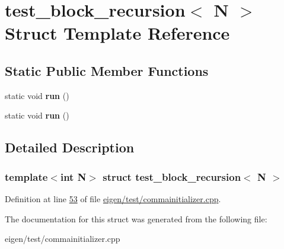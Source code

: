 \hypertarget{structtest__block__recursion}{}\section{test\+\_\+block\+\_\+recursion$<$ N $>$ Struct Template Reference}
\label{structtest__block__recursion}
\subsection*{Static Public Member Functions}
\begin{DoxyCompactItemize}
\item 
\mbox{\label{structtest__block__recursion_a52d065660ea11781e5671ad0e142e0ca}} 
static void {\bfseries run} ()
\item 
\mbox{\label{structtest__block__recursion_a52d065660ea11781e5671ad0e142e0ca}} 
static void {\bfseries run} ()
\end{DoxyCompactItemize}


\subsection{Detailed Description}
\subsubsection*{template$<$int N$>$\newline
struct test\+\_\+block\+\_\+recursion$<$ N $>$}



Definition at line \hyperlink{eigen_2test_2commainitializer_8cpp_source_l00053}{53} of file \hyperlink{eigen_2test_2commainitializer_8cpp_source}{eigen/test/commainitializer.\+cpp}.



The documentation for this struct was generated from the following file\+:\begin{DoxyCompactItemize}
\item 
eigen/test/commainitializer.\+cpp\end{DoxyCompactItemize}

